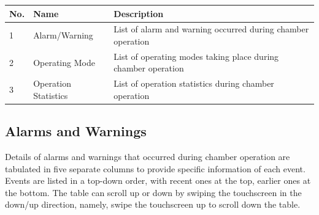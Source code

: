 \begin{longtable}[]{@{}lll@{}}
\toprule
\begin{minipage}[b]{0.04\columnwidth}\raggedright
No.\strut
\end{minipage} & \begin{minipage}[b]{0.23\columnwidth}\raggedright
Name\strut
\end{minipage} & \begin{minipage}[b]{0.65\columnwidth}\raggedright
Description\strut
\end{minipage}\tabularnewline
\midrule
\endhead
\begin{minipage}[t]{0.04\columnwidth}\raggedright
1\strut
\end{minipage} & \begin{minipage}[t]{0.23\columnwidth}\raggedright
Alarm/Warning\strut
\end{minipage} & \begin{minipage}[t]{0.65\columnwidth}\raggedright
List of alarm and warning occurred during chamber operation\strut
\end{minipage}\tabularnewline
\begin{minipage}[t]{0.04\columnwidth}\raggedright
2\strut
\end{minipage} & \begin{minipage}[t]{0.23\columnwidth}\raggedright
Operating Mode\strut
\end{minipage} & \begin{minipage}[t]{0.65\columnwidth}\raggedright
List of operating modes taking place during chamber operation\strut
\end{minipage}\tabularnewline
\begin{minipage}[t]{0.04\columnwidth}\raggedright
3\strut
\end{minipage} & \begin{minipage}[t]{0.23\columnwidth}\raggedright
Operation Statistics\strut
\end{minipage} & \begin{minipage}[t]{0.65\columnwidth}\raggedright
List of operation statistics during chamber operation\strut
\end{minipage}\tabularnewline
\bottomrule
\end{longtable}


\subsection{Alarms and Warnings}

Details of alarms and warnings that occurred during chamber operation
are tabulated in five separate columns to provide specific information
of each event. Events are listed in a top-down order, with recent ones
at the top, earlier ones at the bottom. The table can scroll up or down
by swiping the touchscreen in the down/up direction, namely, swipe the
touchscreen up to scroll down the table.

